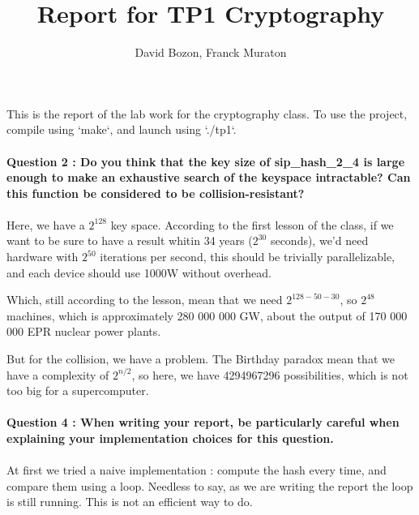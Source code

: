 \documentclass[4apaper]{report}
\author{David Bozon, Franck Muraton}
\begin{document}
\title{Report for TP1 Cryptography}
\maketitle

\paragraph{} This is the report of the lab work for the cryptography class. To use the project, compile using `make`, and launch using `./tp1`.

\paragraph{Question 2 : Do you think that the key size of sip\_hash\_2\_4 is large enough to make an exhaustive search of the keyspace intractable? Can this function be considered to be collision-resistant?}

\paragraph{}Here, we have a $2^{128}$ key space. According to the first lesson of the class, if we want to be sure to have a result whitin 34 years ($2^{30}$ seconds), we'd need hardware with $2^{50}$ iterations per second, this should be trivially parallelizable, and each device should use 1000W without overhead.

Which, still according to the lesson, mean that we need $2^{128-50-30}$, so $2^{48}$ machines, which is approximately 280 000 000 GW, about the output of 170 000 000 EPR nuclear power plants.

But for the collision, we have a problem. The Birthday paradox mean that we have a complexity of $2^{n/2}$, so here, we have 4294967296 possibilities, which is not too big for a supercomputer.

\paragraph{Question 4 : When writing your report, be particularly careful when explaining your implementation
choices for this question.}

\paragraph{} At first we tried a naive implementation : compute the hash every time, and compare them using a loop. Needless to say, as we are writing the report the loop is still running. This is not an efficient way to do.
\end{document}
